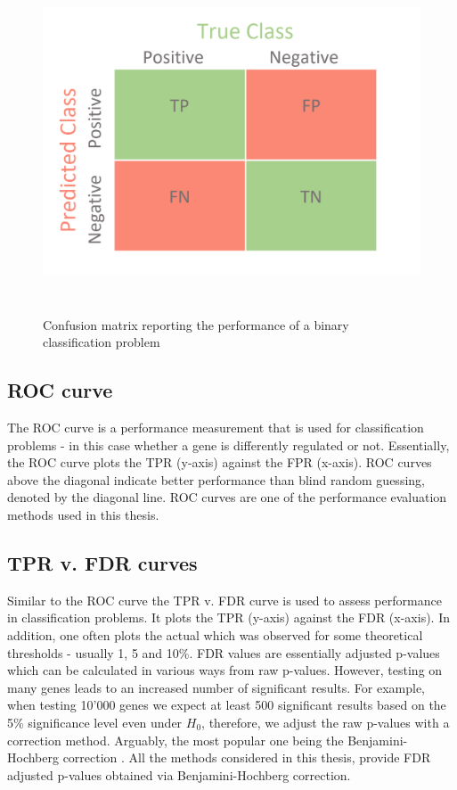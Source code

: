 \begin{figure}[!htb]
\begin{center}
\includegraphics[width=6in,height=4in]{../figures/confusion_matrix.png}
\end{center}
\caption{Confusion matrix reporting the performance of a binary classification problem \citep{confusion_matrix}}
\label{fig:confusion_matrix}
\end{figure}
\FloatBarrier

\subsection{ROC curve}
The ROC curve is a performance measurement that is used for classification problems - in this case whether a gene is differently regulated or not. Essentially, the ROC curve plots the TPR (y-axis) against the FPR (x-axis). ROC curves above the diagonal indicate better performance than blind random guessing, denoted by the diagonal line. ROC curves are one of the performance evaluation methods used in this thesis.

\subsection{TPR v. FDR curves}
Similar to the ROC curve the TPR v. FDR curve is used to assess performance in classification problems. It plots the TPR (y-axis) against the FDR (x-axis). In addition, one often plots the actual which was observed for some theoretical thresholds - usually 1, 5 and 10\%. FDR values are essentially adjusted p-values which can be calculated in various ways from raw p-values. However, testing on many genes leads to an increased number of significant results. For example, when testing 10'000 genes we expect at least 500 significant results based on the 5\% significance level even under $H_0$, therefore, we adjust the raw p-values with a correction method. Arguably, the most popular one being the Benjamini-Hochberg correction \citep{BH_correction}. All the methods considered in this thesis, provide FDR adjusted p-values obtained via Benjamini-Hochberg correction.

